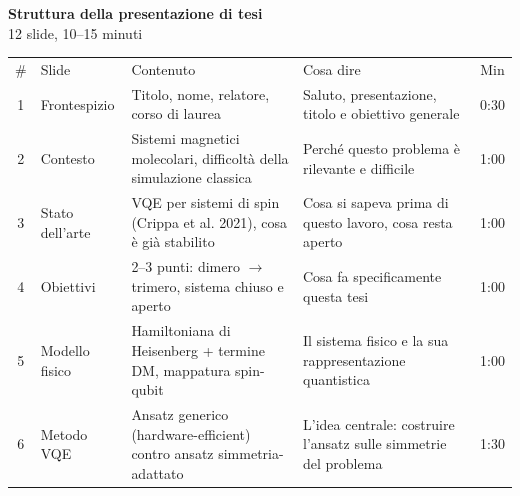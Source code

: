 \documentclass[11pt,a4paper]{article}
\begin{document}
\begin{center}
{\Large\bfseries Struttura della presentazione di tesi}\\[4pt]
{\normalsize 12 slide, 10--15 minuti}
\end{center}

\vspace{10pt}

\begin{center}
\begin{tabular}{c L{2.6cm} L{4.7cm} L{5.5cm} c}
\toprule
{}
\\
\midrule
\# & Slide & Contenuto & Cosa dire & Min \\
\midrule
{}
1 & Frontespizio & Titolo, nome, relatore, corso di laurea & Saluto, presentazione, titolo e obiettivo generale & 0:30 \\
2 & Contesto & Sistemi magnetici molecolari, difficoltà della simulazione classica & Perché questo problema è rilevante e difficile & 1:00 \\
3 & Stato dell'arte & VQE per sistemi di spin (Crippa et al. 2021), cosa è già stabilito & Cosa si sapeva prima di questo lavoro, cosa resta aperto & 1:00 \\
4 & Obiettivi & 2--3 punti: dimero $\to$ trimero, sistema chiuso e aperto & Cosa fa specificamente questa tesi & 1:00 \\
5 & Modello fisico & Hamiltoniana di Heisenberg + termine DM, mappatura spin-qubit & Il sistema fisico e la sua rappresentazione quantistica & 1:00 \\
6 & Metodo VQE & Ansatz generico (hardware-efficient) contro ansatz simmetria-adattato & L'idea centrale: costruire l'ansatz sulle simmetrie del problema & 1:30 \\
\bottomrule
\end{tabular}
\end{center}

\vspace{14pt}
\end{document}
